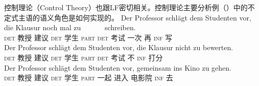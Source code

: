 控制理论（Control Theory）也跟LF密切相关。控制理论主要分析例（）中的不定式主语的语义角色是如何实现的。
\eal
\ex 
\gll Der Professor schlägt dem Studenten vor, die Klausur noch mal zu~~~~~~ schreiben.\\
	 \textsc{det} 教授 建议 \textsc{det} 学生 \textsc{part} \textsc{det} 考试 一次 再 \textsc{inf} 写\\
\ex 
\gll Der Professor schlägt dem Studenten vor, die Klausur nicht zu bewerten.\\
	 \textsc{det} 教授 建议 \textsc{det} 学生 \textsc{part} \textsc{det} 考试 不 \textsc{inf} 打分\\
\ex 
\gll Der Professor schlägt dem Studenten vor, gemeinsam ins Kino zu gehen.\hspace{-3pt}\\
	 \textsc{det} 教授 建议 \textsc{det} 学生 \textsc{part} 一起 进入 电影院 \textsc{inf} 去\\
\zl
{}


